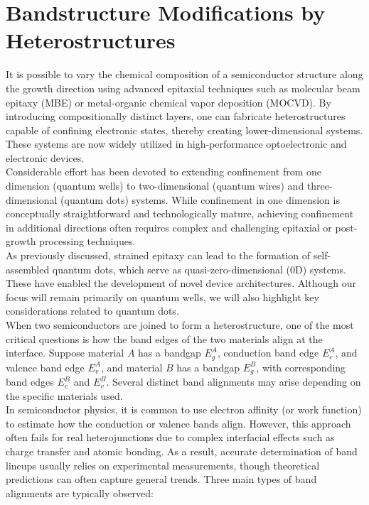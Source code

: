 \section{Bandstructure Modifications by Heterostructures}
It is possible to vary the chemical composition of a semiconductor structure along the growth direction using advanced epitaxial techniques such as molecular beam epitaxy (MBE) or metal-organic chemical vapor deposition (MOCVD). By introducing compositionally distinct layers, one can fabricate heterostructures capable of confining electronic states, thereby creating lower-dimensional systems. These systems are now widely utilized in high-performance optoelectronic and electronic devices.\\
Considerable effort has been devoted to extending confinement from one dimension (quantum wells) to two-dimensional (quantum wires) and three-dimensional (quantum dots) systems. While confinement in one dimension is conceptually straightforward and technologically mature, achieving confinement in additional directions often requires complex and challenging epitaxial or post-growth processing techniques.\\
As previously discussed, strained epitaxy can lead to the formation of self-assembled quantum dots, which serve as quasi-zero-dimensional (0D) systems. These have enabled the development of novel device architectures. Although our focus will remain primarily on quantum wells, we will also highlight key considerations related to quantum dots.\\
When two semiconductors are joined to form a heterostructure, one of the most critical questions is how the band edges of the two materials align at the interface. Suppose material \( A \) has a bandgap \( E_g^A \), conduction band edge \( E_c^A \), and valence band edge \( E_v^A \), and material \( B \) has a bandgap \( E_g^B \), with corresponding band edges \( E_c^B \) and \( E_v^B \). Several distinct band alignments may arise depending on the specific materials used.\\
In semiconductor physics, it is common to use electron affinity (or work function) to estimate how the conduction or valence bands align. However, this approach often fails for real heterojunctions due to complex interfacial effects such as charge transfer and atomic bonding. As a result, accurate determination of band lineups usually relies on experimental measurements, though theoretical predictions can often capture general trends.
Three main types of band alignments are typically observed:

